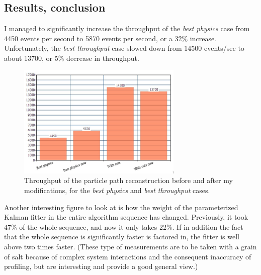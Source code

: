 \documentclass[12pt]{article}
\begin{document}
\subsection{Results, conclusion}

I managed to significantly increase the throughput of the \textit{best physics} case from 4450 events per second to 5870 events per second, or a 32\% increase. Unfortunately, the \textit{best throughput} case slowed down from 14500 events/sec to about 13700, or 5\% decrease in throughput.

\begin{figure}[H]
	\begin{center}
		\includegraphics[width=0.7\textwidth]{kalmanfit_throughput_results_lowquality}
	\end{center}
	\caption{Throughput of the particle path reconstruction before and after my modifications, for the \textit{best physics} and \textit{best throughput} cases.}
	\label{fig_kalmanfit_results_throughput}
\end{figure}

Another interesting figure to look at is how the weight of the parameterized Kalman fitter in the entire algorithm sequence has changed. Previously, it took 47\% of the whole sequence, and now it only takes 22\%. If in addition the fact that the whole sequence is significantly faster is factored in, the fitter is well above two times faster. \small (These type of measurements are to be taken with a grain of salt because of complex system interactions and the consequent inaccuracy of profiling, but are interesting and provide a good general view.) \normalsize
\end{document}
